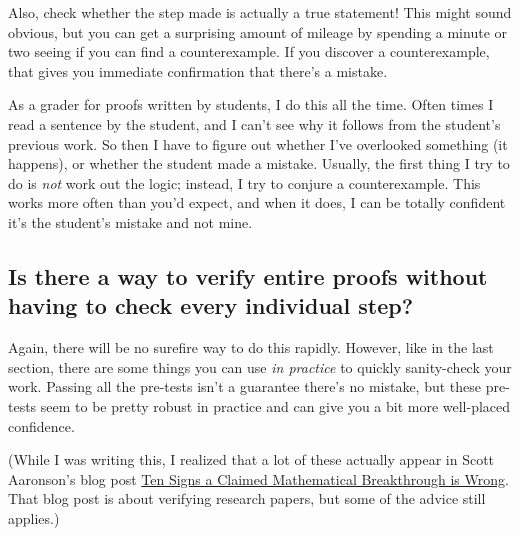 \documentclass[11pt]{scrartcl}
\begin{document}
\begin{itemize}
  \ii Also, \alert{check whether the step made is actually a true statement}!
  This might sound obvious, but you can get a surprising amount of mileage
  by spending a minute or two seeing if you can find a counterexample.
  If you discover a counterexample,
  that gives you immediate confirmation that there's a mistake.

  As a grader for proofs written by students, I do this all the time.
  Often times I read a sentence by the student,
  and I can't see why it follows from the student's previous work.
  So then I have to figure out whether I've overlooked something (it happens),
  or whether the student made a mistake.
  Usually, the first thing I try to do is \emph{not} work out the logic;
  instead, I try to conjure a counterexample.
  This works more often than you'd expect, and when it does,
  I can be totally confident it's the student's mistake and not mine.
\end{itemize}

\subsection{Is there a way to verify entire proofs
  without having to check every individual step?}

Again, there will be no surefire way to do this rapidly.
However, like in the last section, there are some things you can use
\emph{in practice} to quickly sanity-check your work.
Passing all the pre-tests isn't a guarantee there's no mistake,
but these pre-tests seem to be pretty robust in practice and can
give you a bit more well-placed confidence.

(While I was writing this, I realized that a lot of these
actually appear in Scott Aaronson's blog post
\href{https://scottaaronson.blog/?p=304}
{Ten Signs a Claimed Mathematical Breakthrough is Wrong}.
That blog post is about verifying research papers,
but some of the advice still applies.)
\end{document}
